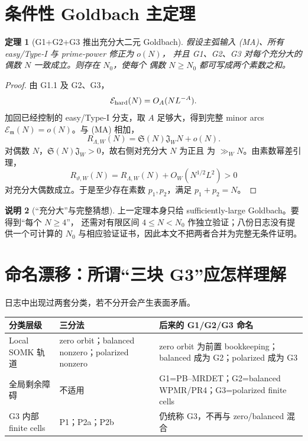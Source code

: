 \documentclass[11pt,a4paper]{ctexart}
\newtheorem{theorem}{定理}[section]
\theoremstyle{definition}
\newtheorem{remark}[theorem]{说明}
\newcommand{\E}{\mathcal E}
\begin{document}
\section{条件性 Goldbach 主定理}

\begin{theorem}[G1+G2+G3 推出充分大二元 Goldbach]
假设主弧输入 \textup{(MA)}、所有 easy/Type-I 与 prime-power 修正为 $o(N)$，
并且 G1、G2、G3 对每个充分大的偶数 $N$ 一致成立。则存在 $N_0$，使每个
偶数 $N\ge N_0$ 都可写成两个素数之和。
\end{theorem}

\begin{proof}
由 G1.1 及 G2、G3，
\[
\E_{\rm hard}(N)=O_A(NL^{-A}).
\]
加回已经控制的 easy/Type-I 分支，取 $A$ 足够大，得到完整 minor arcs
$\E_{\mathfrak m}(N)=o(N)$。与 (MA) 相加，
\[
R_{\Lambda,W}(N)=\mathfrak S(N)\mathfrak J_WN+o(N).
\]
对偶数 $N$，$\mathfrak S(N)\mathfrak J_W>0$，故右侧对充分大 $N$ 为正且
为 $\gg_WN$。由素数幂差引理，
\[
R_{\vartheta,W}(N)
=R_{\Lambda,W}(N)+O_W(N^{1/2}L^2)>0
\]
对充分大偶数成立。于是至少存在素数 $p_1,p_2$，满足 $p_1+p_2=N$。
\end{proof}

\begin{remark}[“充分大”与完整猜想]
上一定理本身只给 sufficiently-large Goldbach。要得到“每个 $N\ge4$”，
还需对有限区间 $4\le N<N_0$ 作独立验证；八份日志没有提供一个可计算的
$N_0$ 与相应验证证书，因此本文不把两者合并为完整无条件证明。
\end{remark}

\section{命名漂移：所谓“三块 G3”应怎样理解}

日志中出现过两套分类，若不分开会产生表面矛盾。

\begin{center}
\begin{tabular}{p{}p{}p{}}
\toprule
分类层级 & 三分法 & 后来的 G1/G2/G3 命名\\
\midrule
Local SOMK 轨道
& zero orbit；balanced nonzero；polarized nonzero
& zero orbit 为前置 bookkeeping；balanced 成为 G2；polarized 成为 G3\\
全局剩余障碍
& 不适用
& G1=PB--MRDET；G2=balanced WPMR/PR4；G3=polarized finite cells\\
G3 内部 finite cells
& P1；P2a；P2b
& 仍统称 G3，不再与 zero/balanced 混合\\
\bottomrule
\end{tabular}
\end{center}
\end{document}

